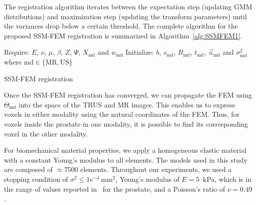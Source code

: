 \documentclass[journal]{IEEEtran}
\begin{document}
The registration algorithm iterates between the expectation step (updating GMM distributions) and maximization step (updating the transform parameters) until the variances drop below a certain threshold. The complete algorithm for the proposed SSM-FEM registration is summarized in Algorithm~\ref{alg:SSMFEM1}.
\begin{algorithm}[t]\label{alg:SSMFEM1}
 \SetAlgoLined
 Require: $E$, $\nu$, $\mu$, $\beta$, $Z$, $\Psi$, $X_\mathrm{md}$ and $w_\mathrm{md}$\;
 Initialize: $b$, $s_\mathrm{md}$, $R_\mathrm{md}$, $t_\mathrm{md}$, $\vec{u}_\mathrm{md}$ and $\sigma^2_\mathrm{md}$\;
 where $\mathrm{md}\in\{\mathrm{MR},\mathrm{US}\}$\;
 \caption{SSM-FEM registration \label{alg:registration}}
\end{algorithm}

Once the SSM-FEM registration has converged, we can propagate the FEM using $\Theta_\mathrm{md}$ into the space of the TRUS and MR images. This enables us to express voxels in either modality using the natural coordinates of the FEM. Thus, for voxels inside the prostate in one modality, it is possible to find its corresponding voxel in the other modality.

For biomechanical material properties, we apply a homogeneous elastic material with a constant Young's modulus to all elements.  The models used in this study are composed of $\approx7500$ elements. Throughout our experiments, we used a stopping condition of $\sigma^2\leq1e^{-4}~\mathrm{mm}^2$, Young's modulus of $E=5$~kPa, which is in the range of values reported in~\cite{Kemper04a} for the prostate, and a Poisson's ratio of $\nu=0.49$.
\end{document}
